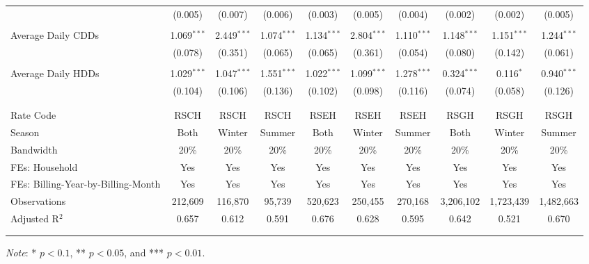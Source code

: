 {\begin{table}[t!]
\begin{adjustbox}{scale = 0.77}
\begin{threeparttable}
\begin{tabular}{@{\extracolsep{3pt}}lccccccccc}
                    & (0.005) & (0.007) & (0.006) & (0.003) & (0.005) & (0.004) & (0.002) & (0.002) & (0.005) \\ 
                    & & & & & & & & & \\ 
                    Average Daily CDDs & 1.069$^{***}$ & 2.449$^{***}$ & 1.074$^{***}$ & 1.134$^{***}$ & 2.804$^{***}$ & 1.110$^{***}$ & 1.148$^{***}$ & 1.151$^{***}$ & 1.244$^{***}$ \\ 
                    & (0.078) & (0.351) & (0.065) & (0.065) & (0.361) & (0.054) & (0.080) & (0.142) & (0.061) \\ 
                    & & & & & & & & & \\ 
                    Average Daily HDDs & 1.029$^{***}$ & 1.047$^{***}$ & 1.551$^{***}$ & 1.022$^{***}$ & 1.099$^{***}$ & 1.278$^{***}$ & 0.324$^{***}$ & 0.116$^{*}$ & 0.940$^{***}$ \\ 
                    & (0.104) & (0.106) & (0.136) & (0.102) & (0.098) & (0.116) & (0.074) & (0.058) & (0.126) \\ 
                    & & & & & & & & & \\
                    \hline
                    \\[-2.0ex]
                    Rate Code & RSCH & RSCH & RSCH & RSEH & RSEH & RSEH & RSGH & RSGH & RSGH \\ 
                    Season & Both & Winter & Summer & Both & Winter & Summer & Both & Winter & Summer \\ 
                    Bandwidth & 20\% & 20\% & 20\% & 20\% & 20\% & 20\% & 20\% & 20\% & 20\% \\ 
                    FEs: Household & Yes & Yes & Yes & Yes & Yes & Yes & Yes & Yes & Yes \\ 
                    FEs: Billing-Year-by-Billing-Month & Yes & Yes & Yes & Yes & Yes & Yes & Yes & Yes & Yes \\ 
                    Observations & 212,609 & 116,870 & 95,739 & 520,623 & 250,455 & 270,168 & 3,206,102 & 1,723,439 & 1,482,663 \\ 
                    Adjusted R$^{2}$ & 0.657 & 0.612 & 0.591 & 0.676 & 0.628 & 0.595 & 0.642 & 0.521 & 0.670 \\
                    \\[-2.0ex]
                    \hline \hline
                    \\[-4.5ex]
                \end{tabular}
                \begin{tablenotes}[flushleft]
                    \footnotesize
                    \item \textit{Note}: * $p < 0.1$, ** $p < 0.05$, and *** $p < 0.01$.
                \end{tablenotes}
            \end{threeparttable}
        \end{adjustbox}
    \end{table}
}
